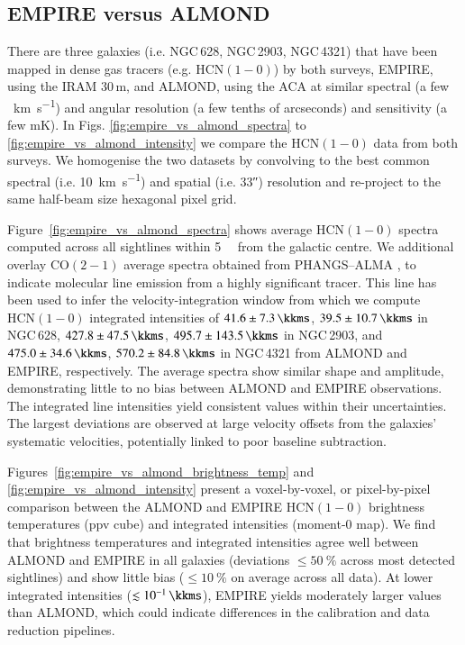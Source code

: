 \documentclass[letter, longauth]{aa} %
\newcommand*{\hcnone}{\ensuremath{\mathrm{HCN(1-0)}}\xspace} %
\newcommand*{\cotwo}{\ensuremath{\mathrm{CO(2-1)}}\xspace} %
\begin{document}
\begin{appendix}

\section{EMPIRE versus ALMOND}
\label{sec:app:empire_vs_almond}

There are three galaxies (i.e. NGC\,628, NGC\,2903, NGC\,4321) that have been mapped in dense gas tracers (e.g. \hcnone) by both surveys, EMPIRE, using the IRAM 30\,m, and ALMOND, using the ACA at similar spectral (a few \SI{}{\km\per\second}) and angular resolution (a few tenths of arcseconds) and sensitivity (a few mK).
In Figs. \ref{fig:empire_vs_almond_spectra} to \ref{fig:empire_vs_almond_intensity} we compare 
the \hcnone data from both surveys.
We homogenise the two datasets by convolving to the best common spectral (i.e. \SI{10}{\km\per\s}) and spatial (i.e. \ang{;;33}) resolution and re-project to the same half-beam size hexagonal pixel grid.

Figure~\ref{fig:empire_vs_almond_spectra} shows average \hcnone spectra computed across all sightlines within \SI{5}{\kilo\parsec} from the galactic centre.
We additional overlay \cotwo average spectra obtained from PHANGS--ALMA \citep{Leroy2021b}, to indicate molecular line emission from a highly significant tracer.
This line has been used to infer the velocity-integration window from which we compute \hcnone integrated intensities of $41.6 \pm \SI{7.3}{\kkms}$, $39.5 \pm \SI{10.7}{\kkms}$ in NGC\,628, $427.8 \pm \SI{47.5}{\kkms}$, $495.7 \pm \SI{143.5}{\kkms}$ in NGC\,2903, and $475.0 \pm \SI{34.6}{\kkms}$, $570.2 \pm \SI{84.8}{\kkms}$ in NGC\,4321 from ALMOND and EMPIRE, respectively.
The average spectra show similar shape and amplitude, demonstrating little to no bias between ALMOND and EMPIRE observations.
The integrated line intensities yield consistent values within their uncertainties.
The largest deviations are observed at large velocity offsets from the galaxies' systematic velocities, potentially linked to poor baseline subtraction.

Figures~\ref{fig:empire_vs_almond_brightness_temp} and \ref{fig:empire_vs_almond_intensity} present a voxel-by-voxel, or pixel-by-pixel comparison between the ALMOND and EMPIRE \hcnone brightness temperatures (ppv cube) and integrated intensities (moment-0 map).
We find that brightness temperatures and integrated intensities agree well between ALMOND and EMPIRE in all galaxies (deviations $\leq\SI{50}{\percent}$ across most detected sightlines) and show little bias ($\leq\SI{10}{\percent}$ on average across all data).
At lower integrated intensities ($\lesssim\SI{e-1}{\kkms}$), EMPIRE yields moderately larger values than ALMOND, which could indicate differences in the calibration and data reduction pipelines.


\end{appendix}
\end{document}
